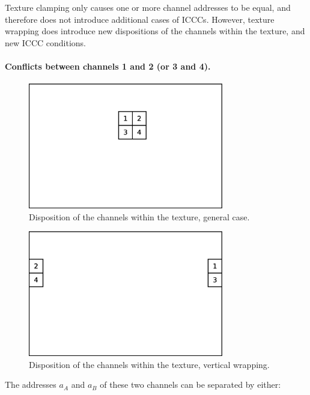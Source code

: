 \documentclass[a4paper,11pt]{kthesis}
\begin{document}
Texture clamping only causes one or more channel addresses to be equal, and therefore does not introduce additional cases of ICCCs. However, texture wrapping does introduce new dispositions of the channels within the texture, and new ICCC conditions.

\paragraph{Conflicts between channels 1 and 2 (or 3 and 4).}
\begin{figure}[htp]
\centering
\includegraphics[height=55mm]{chdisp_common.eps}
\caption{Disposition of the channels within the texture, general case.}\label{fig:chdispcommon}
\end{figure}
\begin{figure}[htp]
\centering
\includegraphics[height=55mm]{chdisp_vwrap.eps}
\caption{Disposition of the channels within the texture, vertical wrapping.}\label{fig:chdispvwrap}
\end{figure}
The addresses $a_{A}$ and $a_{B}$ of these two channels can be separated by either:
\end{document}
